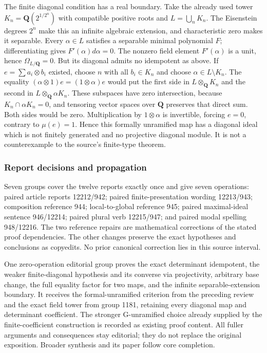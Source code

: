 The finite diagonal condition has a real boundary. Take the already used tower \(K_n=\mathbf Q(2^{1/2^n})\) with compatible positive roots and \(L=\bigcup_nK_n\). The Eisenstein degrees \(2^n\) make this an infinite algebraic extension, and characteristic zero makes it separable. Every \(\alpha\in L\) satisfies a separable minimal polynomial \(F\); differentiating gives \(F'(\alpha)d\alpha=0\). The nonzero field element \(F'(\alpha)\) is a unit, hence \(\Omega_{L/\mathbf Q}=0\). But its diagonal admits no idempotent as above. If \(e=\sum a_i\otimes b_i\) existed, choose \(n\) with all \(b_i\in K_n\) and choose \(\alpha\in L\setminus K_n\). The equality \((\alpha\otimes1)e=(1\otimes\alpha)e\) would put the first side in \(L\otimes_{\mathbf Q}K_n\) and the second in \(L\otimes_{\mathbf Q}\alpha K_n\). These subspaces have zero intersection, because \(K_n\cap\alpha K_n=0\), and tensoring vector spaces over \(\mathbf Q\) preserves that direct sum. Both sides would be zero. Multiplication by \(1\otimes\alpha\) is invertible, forcing \(e=0\), contrary to \(\mu(e)=1\). Hence this formally unramified map has a diagonal ideal which is not finitely generated and no projective diagonal module. It is not a counterexample to the source's finite-type theorem.

\subsubsection{Report decisions and propagation}\label{algebra-proof-056-report-decisions-and-propagation}

Seven groups cover the twelve reports exactly once and give seven operations: paired article reports 12212/942; paired finite-presentation wording 12213/943; composition reference 944; local-to-global reference 945; paired maximal-ideal sentence 946/12214; paired plural verb 12215/947; and paired modal spelling 948/12216. The two reference repairs are mathematical corrections of the stated proof dependencies. The other changes preserve the exact hypotheses and conclusions as copyedits. No prior canonical correction lies in this source interval.

One zero-operation editorial group proves the exact determinant idempotent, the weaker finite-diagonal hypothesis and its converse via projectivity, arbitrary base change, the full equality factor for two maps, and the infinite separable-extension boundary. It receives the formal-unramified criterion from the preceding review and the exact field tower from group 1181, retaining every diagonal map and determinant coefficient. The stronger G-unramified choice already supplied by the finite-coefficient construction is recorded as existing proof content. All fuller arguments and consequences stay editorial; they do not replace the original exposition. Broader synthesis and its paper follow core completion.

